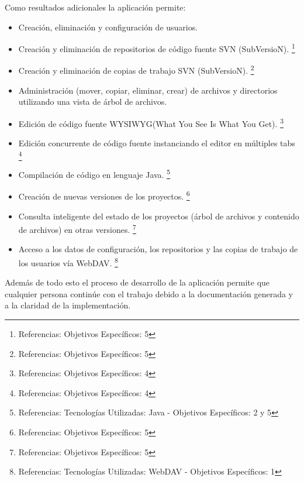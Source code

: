 Como resultados adicionales la aplicación permite:

\begin{itemize}
	
	\item Creación, eliminación y configuración de usuarios.
	
	\item Creación y eliminación de repositorios de código fuente SVN (SubVersioN).
	\footnote {Referencias: Objetivos Específicos: 5}
	
	\item Creación y eliminación de copias de trabajo SVN (SubVersioN).
	\footnote {Referencias: Objetivos Específicos: 5}
	
	\item Administración (mover, copiar, eliminar, crear) de archivos y directorios utilizando una vista de árbol de archivos.
	
	\item Edición de código fuente WYSIWYG(What You See Is What You Get).
	\footnote {Referencias: Objetivos Específicos: 4}
	
	\item Edición concurrente de código fuente instanciando el editor en múltiples tabs
	\footnote {Referencias: Objetivos Específicos: 4}
	
	\item Compilación de código en lenguaje Java.
	\footnote {Referencias: Tecnologías Utilizadas: Java - Objetivos Específicos: 2 y 5}
	
	\item Creación de nuevas versiones de los proyectos.
	\footnote {Referencias: Objetivos Específicos: 5}
	
	\item Consulta inteligente del estado de los proyectos (árbol de archivos y contenido de archivos) en otras versiones.
	\footnote {Referencias: Objetivos Específicos: 5}
	
	\item Acceso a los datos de configuración, los repositorios y las copias de trabajo de los usuarios vía WebDAV.
	\footnote {Referencias: Tecnologías Utilizadas: WebDAV - Objetivos Específicos: 1}
	
\end{itemize}

Además de todo esto el proceso de desarrollo de la aplicación permite que cualquier persona continúe con el trabajo debido a la documentación generada y a la claridad de la implementación.


